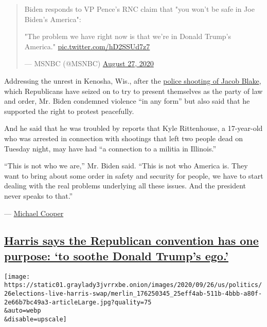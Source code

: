 \begin{quote}
Biden responds to VP Pence's RNC claim that "you won't be safe in Joe
Biden's America":

"The problem we have right now is that we're in Donald Trump's America."
\href{https://t.co/hD2SSUd7z7}{pic.twitter.com/hD2SSUd7z7}

--- MSNBC (@MSNBC)
\href{https://twitter.com/MSNBC/status/1299035406726557696?ref_src=twsrc\%5Etfw}{August
27, 2020}
\end{quote}

Addressing the unrest in Kenosha, Wis., after the
\href{https://www.nytimes3xbfgragh.onion/2020/08/24/us/kenosha-police-shooting.html}{police
shooting of Jacob Blake}, which Republicans have seized on to try to
present themselves as the party of law and order, Mr. Biden condemned
violence ``in any form'' but also said that he supported the right to
protest peacefully.

And he said that he was troubled by reports that Kyle Rittenhouse, a
17-year-old who was arrested in connection with shootings that left two
people dead on Tuesday night, may have had ``a connection to a militia
in Illinois.''

``This is not who we are,'' Mr. Biden said. ``This is not who America
is. They want to bring about some order in safety and security for
people, we have to start dealing with the real problems underlying all
these issues. And the president never speaks to that.''

--- \href{https://www.nytimes3xbfgragh.onion/by/michael-cooper}{Michael
Cooper}

\hypertarget{harris-says-the-republican-convention-has-one-purpose-to-soothe-donald-trumps-ego}{%
\subsection{\texorpdfstring{\protect\hyperlink{harris-says-the-republican-convention-has-one-purpose-to-soothe-donald-trumps-ego}{Harris
says the Republican convention has one purpose: `to soothe Donald
Trump's
ego.'}}{Harris says the Republican convention has one purpose: `to soothe Donald Trump's ego.'}}\label{harris-says-the-republican-convention-has-one-purpose-to-soothe-donald-trumps-ego}}

\texttt{[image: https://static01.graylady3jvrrxbe.onion/images/2020/09/26/us/politics/26elections-live-harris-swap/merlin\_176250345\_25eff4ab-511b-4bbb-a80f-2e66b7bc49a3-articleLarge.jpg?quality=75\\\&auto=webp\\\&disable=upscale]}

